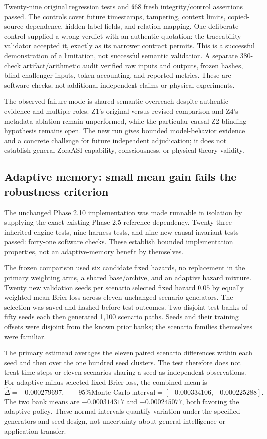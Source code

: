 Twenty-nine original regression tests and 668 fresh integrity/control assertions passed. The controls cover future timestamps, tampering, context limits, copied-source dependence, hidden label fields, and relation mapping. One deliberate control supplied a wrong verdict with an authentic quotation: the traceability validator accepted it, exactly as its narrower contract permits. This is a successful demonstration of a limitation, not successful semantic validation. A separate 380-check artifact/arithmetic audit verified raw inputs and outputs, frozen hashes, blind challenger inputs, token accounting, and reported metrics. These are software checks, not additional independent claims or physical experiments.

The observed failure mode is shared semantic overreach despite authentic evidence and multiple roles. Z1's original-versus-revised comparison and Z4's metadata ablation remain unperformed, while the particular causal Z2 blinding hypothesis remains open. The new run gives bounded model-behavior evidence and a concrete challenge for future independent adjudication; it does not establish general ZoraASI capability, consciousness, or physical theory validity.


\subsection{Adaptive memory: small mean gain fails the robustness criterion}
The unchanged Phase 2.10 implementation was made runnable in isolation by supplying the exact existing Phase 2.5 reference dependency. Twenty-three inherited engine tests, nine harness tests, and nine new causal-invariant tests passed: forty-one software checks. These establish bounded implementation properties, not an adaptive-memory benefit by themselves.

The frozen comparison used six candidate fixed hazards, no replacement in the primary weighting arms, a shared base/archive, and an adaptive hazard mixture. Twenty new validation seeds per scenario selected fixed hazard $0.05$ by equally weighted mean Brier loss across eleven unchanged scenario generators. The selection was saved and hashed before test outcomes. Two disjoint test banks of fifty seeds each then generated 1,100 scenario paths. Seeds and their training offsets were disjoint from the known prior banks; the scenario families themselves were familiar.

The primary estimand averages the eleven paired scenario differences within each seed and then over the one hundred seed clusters. The test therefore does not treat time steps or eleven scenarios sharing a seed as independent observations. For adaptive minus selected-fixed Brier loss, the combined mean is
\begin{equation}
 \widehat\Delta=-0.000279697,\qquad
 \text{95\% Monte Carlo interval}=[-0.000334106,-0.000225288].
\end{equation}
The two bank means are $-0.000314317$ and $-0.000245077$, both favoring the adaptive policy. These normal intervals quantify variation under the specified generators and seed design, not uncertainty about general intelligence or application transfer.

